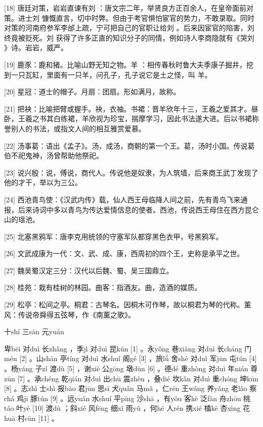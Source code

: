 \documentclass[12pt,UTF8]{ctexbook}
\begin{document}
[18] 唐廷对策，岩岩直谏有刘 ：唐文宗二年，举贤良方正百余人，在皇帝面前对策。进士刘 慷慨直言，切中时弊。但由于考官惧怕宦官的势力，不敢录取。同时对策的河南府参军李邰上疏，宁可把自己的官职让给刘 。后来因宦官的陷害，刘 终竟被贬死。刘 获得了许多正直的知识分子的同情，例如诗人李商隐就有《哭刘 》诗。岩岩，威严。

[19] 鹿豕：鹿和猪。比喻山野无知之物。羊 ：相传春秋时鲁大夫季康子掘井，挖到一只瓦缸，里面有一只羊，问孔子，孔子说它是土之怪，叫 羊。

[20] 星冠：道士的帽子。月扇：团扇。形如满月，故称。

[21] 把袂：比喻把臂或握手。袂，衣袖。书裙：晋羊欣年十三，王羲之爱其才。昼卧，王羲之书其白练裙，羊欣视为珍宝，揣摩学习，因此书法遂大进。后以书裙称誉别人的书法，或指文人间的相互雅赏爱慕。

[22] 汤事葛：语出《孟子》。汤，成汤，商朝的第一个王。葛，汤时小国。传说葛伯不祀鬼神，汤曾帮助他祭祀。

[23] 说兴殷：说，傅说，商代人。传说他是奴隶，为人筑墙，后来商王武丁发现了他的才干，举以为三公。

[24] 西池青鸟使：《汉武内传》载，仙人西王母临降人间之前，先有青鸟飞来通报，后来诗词中多以青鸟为传达爱情信息的使者。西池，传说西王母住在西方昆仑山的瑶池。

[25] 北塞黑鸦军：唐李克用统领的守塞军队都穿黑色衣甲，号黑鸦军。

[26] 文武成康为一代：文、武、成、康，西周初的四个王，史称是承平之世。

[27] 魏吴蜀汉定三分：汉代以后魏、蜀、吴三国鼎立。

[28] 桂苑：栽有桂树的林园。曲客：指酒友。曲，造酒的媒质。

[29] 松亭：松间之亭。桐君：古琴名。因桐木可作琴，故以桐君为琴的代称。薰风：传说帝舜得五弦琴，作《南薰之歌》。





十shí 三sān 元yuán


卑bēi 对duì 长zhǎng ，季jì 对duì 昆kūn [1] 。永yǒng 巷xiàng 对duì 长cháng 门mén [2] 。山shān 亭tíng 对duì 水shuǐ 阁gé [3] ，旅lǚ 舍shè 对duì 军jūn 屯tún [4] 。杨yáng 子zǐ 渡dù [5] ，谢xiè 公gōng 墩dūn [6] 。德dé 重zhòng 对duì 年nián 尊zūn [7] 。承chéng 乾qián 对duì 出chū 震zhèn ，叠dié 坎kǎn 对duì 重chóng 坤kūn [8] 。志zhì 士shì 报bào 君jūn 思sī 犬quǎn 马mǎ ，仁rén 王wáng 养yǎng 老lǎo 察chá 鸡jī 豚tún [9] 。远yuǎn 水shuǐ 平píng 沙shā ，有yǒu 客kè 泛fàn 舟zhōu 桃táo 叶yè [10] 渡dù ；斜xié 风fēng 细xì 雨yǔ ，何hé 人rén 携xié 榼kē 杏xìng 花huā 村cūn [11] 。
\end{document}
